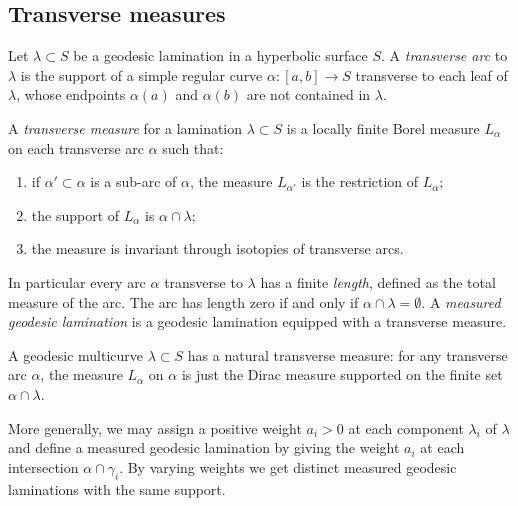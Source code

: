 
\subsection{Transverse measures}
Let $\lambda\subset S$ be a geodesic lamination in a hyperbolic surface $S$. A \emph{transverse arc} to $\lambda$ is the support of a simple regular curve $\alpha\colon [a,b] \to S$ transverse to each leaf of $\lambda$, whose endpoints $\alpha(a)$ and $\alpha(b)$ are not contained in $\lambda$. 

\begin{defn} \label{measure:axioms:defn}
A \emph{transverse measure} for a lamination $\lambda\subset S$ is a locally finite Borel measure $L_\alpha$ on each transverse arc $\alpha$ such that:
\begin{enumerate}
\item if $\alpha' \subset \alpha$ is a sub-arc of $\alpha$, the measure $L_{\alpha'}$ is the restriction of $L_\alpha$;
\item the support of $L_\alpha$ is $\alpha\cap \lambda$;
\item the measure is invariant through isotopies of transverse arcs.
\end{enumerate}
\end{defn}
In particular every arc $\alpha$ transverse to $\lambda$ has a finite \emph{length}, defined as the total measure of the arc. The arc has length zero if and only if $\alpha\cap\lambda = \emptyset$. A \emph{measured geodesic lamination} is a geodesic lamination equipped with a transverse measure.

\begin{example} \label{weight:example}
A geodesic multicurve $\lambda \subset S$ has a natural transverse measure: for any transverse arc $\alpha$, the measure $L_\alpha$ on $\alpha$ is just the Dirac measure supported on the finite set $\alpha\cap\lambda$.

More generally, we may assign a positive weight $a_i>0$ at each component $\lambda_i$ of $\lambda$ and define a measured geodesic lamination by giving the weight $a_i$ at each intersection $\alpha \cap \gamma_i$. By varying weights we get distinct measured geodesic laminations with the same support.
\end{example}

